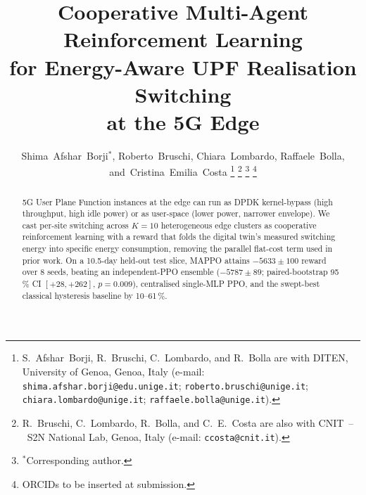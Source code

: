 \documentclass[journal]{IEEEtran}
\begin{document}
\title{Cooperative Multi-Agent Reinforcement Learning\\
       for Energy-Aware UPF Realisation Switching\\
       at the 5G Edge}

\author{%
  Shima~Afshar~Borji$^{*}$,
  Roberto~Bruschi,
  Chiara~Lombardo,
  Raffaele~Bolla,
  and~Cristina~Emilia~Costa%
  \thanks{S.~Afshar~Borji, R.~Bruschi, C.~Lombardo, and R.~Bolla are
  with DITEN, University of Genoa, Genoa, Italy
  (e-mail: \texttt{shima.afshar.borji@edu.unige.it};
   \texttt{roberto.bruschi@unige.it};
   \texttt{chiara.lombardo@unige.it};
   \texttt{raffaele.bolla@unige.it}).}%
  \thanks{R.~Bruschi, C.~Lombardo, R.~Bolla, and C.~E.~Costa are also
  with CNIT~--~S2N National Lab, Genoa, Italy
  (e-mail: \texttt{ccosta@cnit.it}).}%
  \thanks{$^{*}$Corresponding author.}%
  \thanks{ORCIDs to be inserted at submission.}%
}


\maketitle

\begin{abstract}
5G User Plane Function instances at the edge can run as DPDK
kernel-bypass (high throughput, high idle power) or as user-space
(lower power, narrower envelope). We cast per-site switching across
$K\!=\!10$ heterogeneous edge clusters as cooperative
reinforcement learning with a reward that folds the digital twin's
measured switching energy into specific energy consumption,
removing the parallel flat-cost term used in prior work. On a
10.5-day held-out test slice, MAPPO attains $-5633\!\pm\!100$
reward over $8$ seeds, beating an independent-PPO ensemble
($-5787\!\pm\!89$; paired-bootstrap 95\,\% CI $[+28,+262]$,
$p\!=\!0.009$), centralised single-MLP PPO, and the swept-best
classical hysteresis baseline by 10--61\,\%.
\end{abstract}
\end{document}
